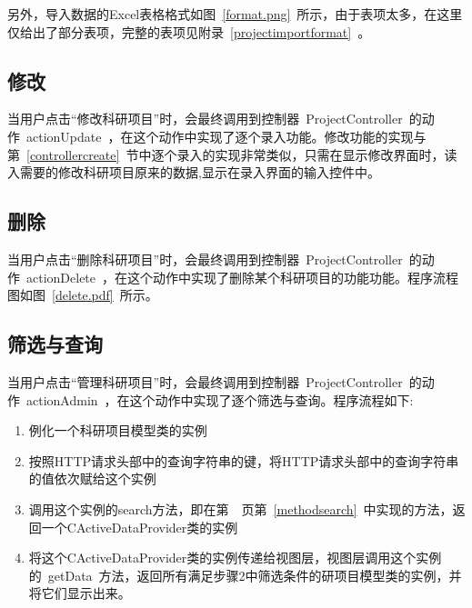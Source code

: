 
另外，导入数据的Excel表格格式如图~\ref{format.png}~所示，由于表项太多，在这里仅给出了部分表项，完整的表项见附录~\ref{projectimportformat}~。


\subsection{修改}
当用户点击“修改科研项目”时，会最终调用到控制器~ProjectController~的动作~actionUpdate~，在这个动作中实现了逐个录入功能。修改功能的实现与第~\ref{controllercreate}~节中逐个录入的实现非常类似，只需在显示修改界面时，读入需要的修改科研项目原来的数据,显示在录入界面的输入控件中。

\subsection{删除}
当用户点击“删除科研项目”时，会最终调用到控制器~ProjectController~的动作~actionDelete~，在这个动作中实现了删除某个科研项目的功能功能。程序流程图如图~\ref{delete.pdf}~所示。



\subsection{筛选与查询}
当用户点击“管理科研项目”时，会最终调用到控制器~ProjectController~的动作~actionAdmin~，在这个动作中实现了逐个筛选与查询。程序流程如下:
\begin{enumerate}
\item 例化一个科研项目模型类的实例
\item 按照HTTP请求头部中的查询字符串的键，将HTTP请求头部中的查询字符串的值依次赋给这个实例
\item 调用这个实例的search方法，即在第~\pageref{methodsearch}~页第~\ref{methodsearch}~中实现的方法，返回一个CActiveDataProvider类的实例
\item 将这个CActiveDataProvider类的实例传递给视图层，视图层调用这个实例的~getData~方法，返回所有满足步骤2中筛选条件的研项目模型类的实例，并将它们显示出来。
\end{enumerate}